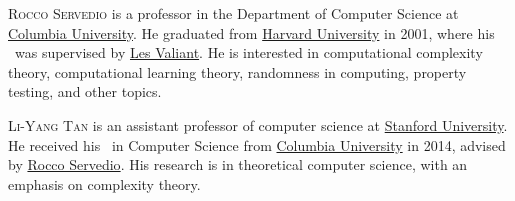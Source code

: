 \documentclass{toc}
\theoremstyle{plain}
\begin{document}
%
%
%
%
%
%
%
%
%
%
%
%
%
%
\begin{tocaboutauthors}
\begin{tocabout}[servedio]  %
  \textsc{Rocco Servedio} is a professor in the Department of Computer Science at \href{https://www.columbia.edu}{Columbia University}. He graduated from \href{https://www.harvard.edu}{Harvard University} in 2001, 
%
%
where his \phd\ was supervised by \href{https://people.seas.harvard.edu/~valiant/}{Les Valiant}. He is interested in computational complexity theory, computational learning theory, randomness in computing, property testing, and other topics.
\end{tocabout}
\begin{tocabout}[tan]
  \textsc{Li-Yang Tan} is an assistant professor of computer science at 
\href{https://www.stanford.edu}{Stanford University}.  He received his \phd\
in Computer Science from
\href{https://www.columbia.edu}{Columbia University} in 2014, 
advised by \href{https://www.cs.columbia.edu/~rocco}{Rocco Servedio}.
His research is in theoretical computer science, with an emphasis on
complexity theory.  
\end{tocabout}
\end{tocaboutauthors}
\end{document}
